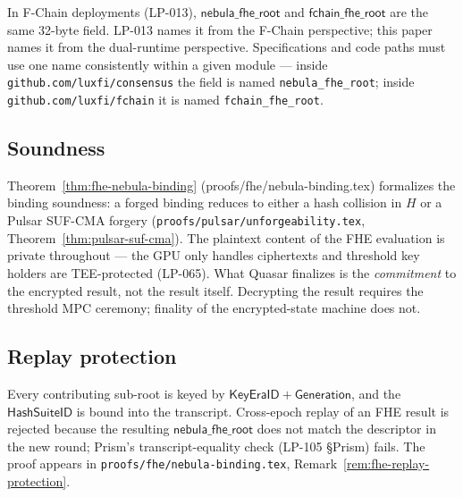 In F-Chain deployments (LP-013), $\mathsf{nebula\_fhe\_root}$ and
$\mathsf{fchain\_fhe\_root}$ are the same 32-byte field. LP-013 names
it from the F-Chain perspective; this paper names it from the
dual-runtime perspective. Specifications and code paths must use one
name consistently within a given module --- inside
\texttt{github.com/luxfi/consensus} the field is named
\texttt{nebula\_fhe\_root}; inside \texttt{github.com/luxfi/fchain}
it is named \texttt{fchain\_fhe\_root}.

\subsection{Soundness}

Theorem~\ref{thm:fhe-nebula-binding} (proofs/fhe/nebula-binding.tex)
formalizes the binding soundness: a forged binding reduces to either
a hash collision in $H$ or a Pulsar SUF-CMA forgery
(\texttt{proofs/pulsar/unforgeability.tex},
Theorem~\ref{thm:pulsar-suf-cma}). The plaintext content of the FHE
evaluation is private throughout --- the GPU only handles ciphertexts
and threshold key holders are TEE-protected (LP-065). What Quasar
finalizes is the \emph{commitment} to the encrypted result, not the
result itself. Decrypting the result requires the threshold MPC
ceremony; finality of the encrypted-state machine does not.

\subsection{Replay protection}

Every contributing sub-root is keyed by $\mathsf{KeyEraID} +
\mathsf{Generation}$, and the $\mathsf{HashSuiteID}$ is bound into the
transcript. Cross-epoch replay of an FHE result is rejected because
the resulting $\mathsf{nebula\_fhe\_root}$ does not match the
descriptor in the new round; Prism's transcript-equality check
(LP-105 \S Prism) fails. The proof appears in
\texttt{proofs/fhe/nebula-binding.tex}, Remark~\ref{rem:fhe-replay-protection}.
